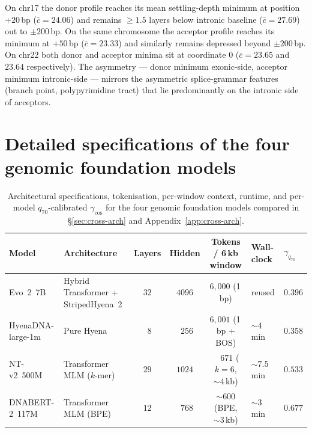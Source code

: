 \documentclass{article}
\theoremstyle{plain}
\theoremstyle{definition}
\theoremstyle{remark}
\begin{document}
On chr17 the donor profile reaches its mean settling-depth minimum at
position $+20$\,bp ($\bar c = 24.06$) and remains $\ge 1.5$ layers
below intronic baseline ($\bar c = 27.69$) out to $\pm 200$\,bp. On
the same chromosome the acceptor profile reaches its minimum at
$+50$\,bp ($\bar c = 23.33$) and similarly remains depressed beyond
$\pm 200$\,bp. On chr22 both donor and acceptor minima sit at coordinate
$0$ ($\bar c = 23.65$ and $23.64$ respectively). The asymmetry --- donor
minimum exonic-side, acceptor minimum intronic-side --- mirrors the
asymmetric splice-grammar features (branch point, polypyrimidine tract)
that lie predominantly on the intronic side of acceptors.

\section{Detailed specifications of the four genomic foundation models}
\label{app:fm-specs}

\begin{table}[h]
\caption{Architectural specifications, tokenisation, per-window context,
runtime, and per-model $q_{70}$-calibrated $\gamma_{\cos}$ for the four
genomic foundation models compared in \S\ref{sec:cross-arch} and
Appendix~\ref{app:cross-arch}.}
\label{tab:fm-specs}
\centering
\footnotesize
\setlength{\tabcolsep}{4pt}
\begin{tabular}{@{}llcccll@{}}
\toprule
Model & Architecture & Layers & Hidden & Tokens / 6\,kb window
   & Wall-clock & $\gamma_{q_{70}}$ \\
\midrule
Evo~2~7B          & Hybrid Transformer + StripedHyena~2 & $32$ & $4096$
   & $6{,}000$ (1\,bp)         & reused      & $0.396$ \\
HyenaDNA-large-1m & Pure Hyena                          & $\phantom{0}8$ & $\phantom{0}256$
   & $6{,}001$ (1\,bp + BOS)   & $\sim 4$\,min    & $0.358$ \\
NT-v2~500M        & Transformer MLM ($k$-mer)           & $29$ & $1024$
   & $\phantom{0,}671$ ($k=6$, $\sim 4$\,kb) & $\sim 7.5$\,min  & $0.533$ \\
DNABERT-2~117M    & Transformer MLM (BPE)               & $12$ & $\phantom{0}768$
   & $\sim 600$ (BPE, $\sim 3$\,kb)        & $\sim 3$\,min    & $0.677$ \\
\bottomrule
\end{tabular}
\end{table}
\end{document}
